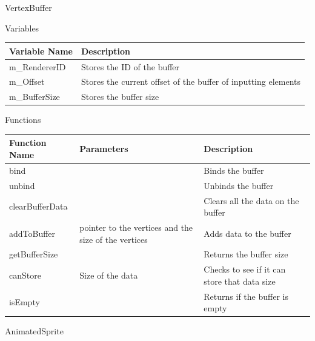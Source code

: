 \documentclass{article}
\begin{document}
                VertexBuffer
                \begin{center}
                    Variables
                    \begin{tabular}{ | m{} | m{} | }
                        \hline
                        \textbf{Variable Name} & \textbf{Description} \\
                        \hline
                        m\_RendererID & Stores the ID of the buffer \\
                        \hline
                        m\_Offset & Stores the current offset of the buffer of inputting elements \\
                        \hline
                        m\_BufferSize & Stores the buffer size \\
                        \hline
                    \end{tabular}
                    Functions
                    \begin{tabular}{ | m{} | m{}| m{} | }
                        \hline
                        \textbf{Function Name} & \textbf{Parameters} & \textbf{Description} \\
                        \hline
                        bind & & Binds the buffer \\
                        \hline
                        unbind & & Unbinds the buffer \\
                        \hline
                        clearBufferData & & Clears all the data on the buffer \\
                        \hline
                        addToBuffer & pointer to the vertices and the size of the vertices & Adds data to the buffer \\
                        \hline
                        getBufferSize & & Returns the buffer size \\
                        \hline
                        canStore & Size of the data & Checks to see if it can store that data size \\
                        \hline
                        isEmpty & & Returns if the buffer is empty \\
                        \hline
                    \end{tabular}
                \end{center}
                AnimatedSprite
\end{document}

